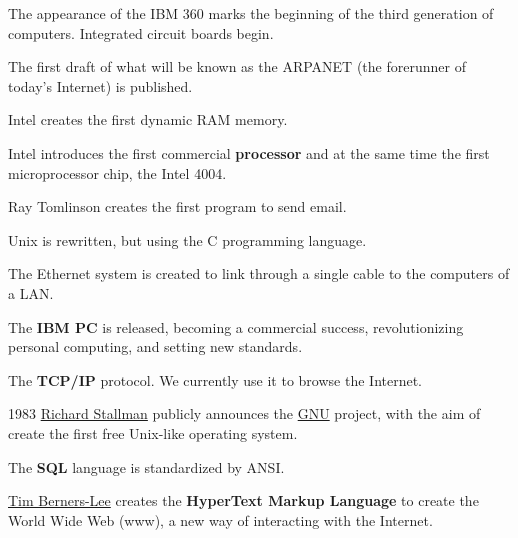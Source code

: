 \begin{description}
    \item[1964] The appearance of the IBM 360 marks the beginning of the third generation of computers. Integrated circuit boards begin.

    \item[1969] The first draft of what will be known as the ARPANET (the forerunner of today's Internet) is published.

    \item[1970] Intel creates the first dynamic RAM memory.

    \item[1971] Intel introduces the first commercial \textbf{processor} and at the same time the first microprocessor chip, the Intel 4004.

    \item[1971] Ray Tomlinson creates the first program to send email.

    \item[1972] Unix is rewritten, but using the C programming language.

    \item[1974] The Ethernet system is created to link through a single cable to the computers of a LAN.

    \item[1981] The \textbf{IBM PC} is released, becoming a commercial success, revolutionizing personal computing, and setting new standards.

    \item[1981] The \textbf{TCP/IP} protocol. We currently use it to browse the Internet.

    \vspace{10pt}
    \begin{minipage}{0.75\linewidth}
        \item[1983] \href{https://es.wikipedia.org/wiki/Richard_Stallman}{Richard Stallman} publicly announces the \href{https://es.wikipedia.org/wiki/GNU}{GNU} project, with the aim of create the first free Unix-like operating system.
    \end{minipage}
    \hfill
    \begin{minipage}{0.15\linewidth}
        \hfill
        
    \end{minipage}

    \item[1986] The \textbf{SQL} language is standardized by ANSI.

    \item[1990] \href{https://es.wikipedia.org/wiki/Tim_Berners-Lee}{Tim Berners-Lee} creates the \textbf{HyperText Markup Language} to create the World Wide Web (www), a new way of interacting with the Internet.


\end{description}
